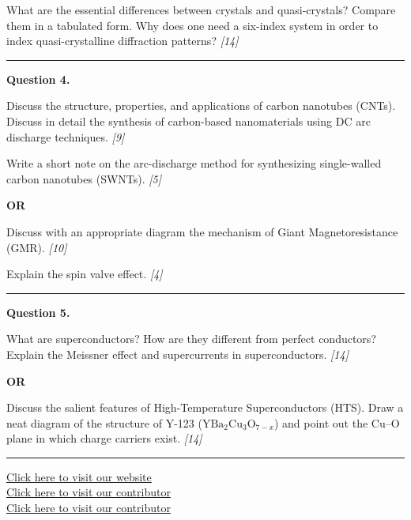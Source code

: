 \documentclass[11pt,a4paper]{article}
\newcommand{\pts}[1]{\hfill   \textit{[#1]}}
\begin{document}
\begin{parts}
  \item What are the essential differences between crystals and quasi-crystals? Compare them in a tabulated form. Why does one need a six-index system in order to index quasi-crystalline diffraction patterns? \pts{14}
\end{parts}

\medskip\rule{\linewidth}{0.2pt}




\noindent   \textbf{Question 4.}

\begin{parts}
  \item Discuss the structure, properties, and applications of carbon nanotubes (CNTs). Discuss in detail the synthesis of carbon-based nanomaterials using DC arc discharge techniques. \pts{9}
  \item Write a short note on the arc-discharge method for synthesizing single-walled carbon nanotubes (SWNTs). \pts{5}
\end{parts}
\hfill   \textbf{OR}

\begin{parts}
  \item Discuss with an appropriate diagram the mechanism of Giant Magnetoresistance (GMR). \pts{10}
  \item Explain the spin valve effect. \pts{4}
\end{parts}

\medskip\rule{\linewidth}{0.2pt}




\noindent   \textbf{Question 5.}

\begin{parts}
  \item What are superconductors? How are they different from perfect conductors? Explain the Meissner effect and supercurrents in superconductors. \pts{14}
\end{parts}
\hfill   \textbf{OR}

\begin{parts}
  \item Discuss the salient features of High-Temperature Superconductors (HTS). Draw a neat diagram of the structure of Y-123 ($ \text{YBa}_2 \text{Cu}_3 \text{O}_{7-x}$) and point out the $ \text{Cu--O}$ plane in which charge carriers exist. \pts{14}
\end{parts}

\vfill
\rule{\linewidth}{0.4pt}

\begin{center}\small
  \href{https://bhu-exam.vercel.app/}{Click here to visit our website}\\[4pt]
  \href{https://me-aryan.vercel.app/}{Click here to visit our contributor}\\[4pt]
  \href{https://quashan-me.vercel.app/}{Click here to visit our contributor}
\end{center}
\end{document}
